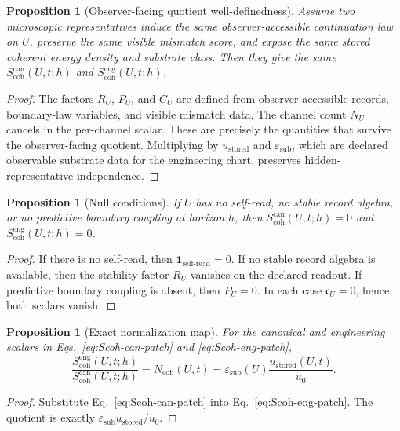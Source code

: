 \documentclass[11pt]{article}
\numberwithin{equation}{section}
\newtheorem{proposition}[theorem]{Proposition}
\theoremstyle{remark}
\newcommand{\scohcan}{S_{\mathrm{coh}}^{\mathrm{can}}}
\newcommand{\scoheng}{S_{\mathrm{coh}}^{\mathrm{eng}}}
\newcommand{\Ncoh}{N_{\mathrm{coh}}}
\newcommand{\eps}{\varepsilon}
\begin{document}
\begin{proposition}[Observer-facing quotient well-definedness]
Assume two microscopic representatives induce the same observer-accessible
continuation law on \(U\), preserve the same visible mismatch score, and expose the
same stored coherent energy density and substrate class. Then they give the same
\(\scohcan(U,t;h)\) and \(\scoheng(U,t;h)\).
\end{proposition}

\begin{proof}
The factors \(R_U\), \(P_U\), and \(C_U\) are defined from observer-accessible
records, boundary-law variables, and visible mismatch data. The channel count
\(N_U\) cancels in the per-channel scalar. These are precisely the quantities
that survive the observer-facing quotient. Multiplying by \(u_{\mathrm{stored}}\)
and \(\eps_{\mathrm{sub}}\), which are declared observable substrate data for
the engineering chart, preserves hidden-representative independence.
\end{proof}

\begin{proposition}[Null conditions]
If \(U\) has no self-read, no stable record algebra, or no predictive boundary
coupling at horizon \(h\), then \(\scohcan(U,t;h)=0\) and
\(\scoheng(U,t;h)=0\).
\end{proposition}

\begin{proof}
If there is no self-read, then
\(\mathbf 1_{\mathrm{self\mbox{-}read}}=0\). If no stable record algebra is
available, then the stability factor \(R_U\) vanishes on the declared readout.
If predictive boundary coupling is absent, then \(P_U=0\). In each case
\(\mathfrak c_U=0\), hence both scalars vanish.
\end{proof}

\begin{proposition}[Exact normalization map]
For the canonical and engineering scalars in Eqs.~\eqref{eq:Scoh-can-patch}
and \eqref{eq:Scoh-eng-patch},
\begin{equation}
\boxed{
\frac{\scoheng(U,t;h)}{\scohcan(U,t;h)}
=
\Ncoh(U,t)
=
\eps_{\mathrm{sub}}(U)\frac{u_{\mathrm{stored}}(U,t)}{u_0}.
}
\label{eq:normalization-map}
\end{equation}
\end{proposition}

\begin{proof}
Substitute Eq.~\eqref{eq:Scoh-can-patch} into
Eq.~\eqref{eq:Scoh-eng-patch}. The quotient is exactly
\(\eps_{\mathrm{sub}}u_{\mathrm{stored}}/u_0\).
\end{proof}
\end{document}
